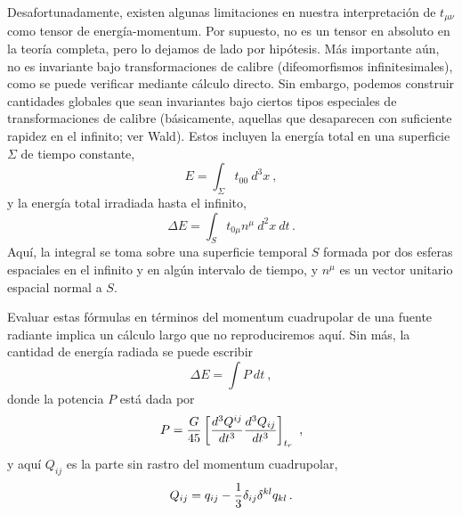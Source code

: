 \documentclass[11pt,b5paper,openany,twoside]{book}
\newcommand{\mn}{{\mu\nu}}
\begin{document}
Desafortunadamente, existen algunas limitaciones en nuestra interpretación de $t_\mn$ como tensor de energía-momentum.
Por supuesto, no es un tensor en absoluto en la teoría completa, pero lo dejamos de lado por hipótesis.
Más importante aún, no es invariante bajo transformaciones de calibre (difeomorfismos infinitesimales), como se puede verificar mediante cálculo directo.
Sin embargo, podemos construir cantidades globales que sean invariantes bajo ciertos tipos especiales de transformaciones de calibre (básicamente, aquellas que desaparecen con suficiente rapidez en el infinito; ver Wald).
Estos incluyen la energía total en una superficie $\Sigma$ de tiempo constante,
\begin{equation}
E=\int_\Sigma t_{00}~d^3x\ ,\label{6.102}
\end{equation}
y la energía total irradiada hasta el infinito,
\begin{equation}
\Delta E = \int_S t_{0\mu} n^\mu ~d^2x~dt\,.\label{6.103}
\end{equation}
Aquí, la integral se toma sobre una superficie temporal $S$ formada por dos esferas espaciales en el infinito y en algún intervalo de tiempo, y $n^\mu$ es un vector unitario espacial normal a $S$.

Evaluar estas fórmulas en términos del momentum cuadrupolar de una fuente radiante implica un cálculo largo que no reproduciremos aquí.
Sin más, la cantidad de energía radiada se puede escribir
\begin{equation}
\Delta E = \int P ~dt\ ,\label{6.104}
\end{equation}
donde la potencia $P$ está dada por
\begin{equation}
P = {{G}\over {45}}\left[{{d^3 Q^{ij}}\over{dt^3}}
{{d^3 Q_{ij}}\over{dt^3}}\right]_{t_r}\ ,\label{6.105}
\end{equation}
y aquí $Q_{ij}$ es la parte sin rastro del momentum cuadrupolar,
\begin{equation}
Q_{ij} = q_{ij}-{1\over 3}\delta_{ij} \delta^{kl}
q_{kl}\,.\label{6.106}
\end{equation}
\end{document}
